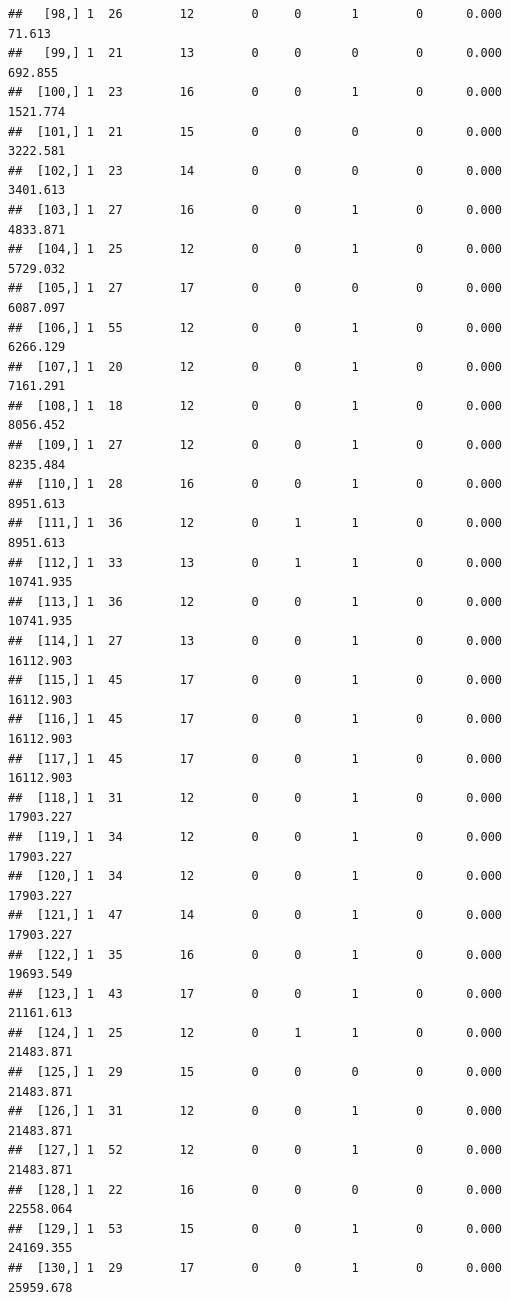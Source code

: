 \documentclass[
]{article}
\begin{document}
\begin{verbatim}
##   [98,] 1  26        12        0     0       1        0      0.000     71.613
##   [99,] 1  21        13        0     0       0        0      0.000    692.855
##  [100,] 1  23        16        0     0       1        0      0.000   1521.774
##  [101,] 1  21        15        0     0       0        0      0.000   3222.581
##  [102,] 1  23        14        0     0       0        0      0.000   3401.613
##  [103,] 1  27        16        0     0       1        0      0.000   4833.871
##  [104,] 1  25        12        0     0       1        0      0.000   5729.032
##  [105,] 1  27        17        0     0       0        0      0.000   6087.097
##  [106,] 1  55        12        0     0       1        0      0.000   6266.129
##  [107,] 1  20        12        0     0       1        0      0.000   7161.291
##  [108,] 1  18        12        0     0       1        0      0.000   8056.452
##  [109,] 1  27        12        0     0       1        0      0.000   8235.484
##  [110,] 1  28        16        0     0       1        0      0.000   8951.613
##  [111,] 1  36        12        0     1       1        0      0.000   8951.613
##  [112,] 1  33        13        0     1       1        0      0.000  10741.935
##  [113,] 1  36        12        0     0       1        0      0.000  10741.935
##  [114,] 1  27        13        0     0       1        0      0.000  16112.903
##  [115,] 1  45        17        0     0       1        0      0.000  16112.903
##  [116,] 1  45        17        0     0       1        0      0.000  16112.903
##  [117,] 1  45        17        0     0       1        0      0.000  16112.903
##  [118,] 1  31        12        0     0       1        0      0.000  17903.227
##  [119,] 1  34        12        0     0       1        0      0.000  17903.227
##  [120,] 1  34        12        0     0       1        0      0.000  17903.227
##  [121,] 1  47        14        0     0       1        0      0.000  17903.227
##  [122,] 1  35        16        0     0       1        0      0.000  19693.549
##  [123,] 1  43        17        0     0       1        0      0.000  21161.613
##  [124,] 1  25        12        0     1       1        0      0.000  21483.871
##  [125,] 1  29        15        0     0       0        0      0.000  21483.871
##  [126,] 1  31        12        0     0       1        0      0.000  21483.871
##  [127,] 1  52        12        0     0       1        0      0.000  21483.871
##  [128,] 1  22        16        0     0       0        0      0.000  22558.064
##  [129,] 1  53        15        0     0       1        0      0.000  24169.355
##  [130,] 1  29        17        0     0       1        0      0.000  25959.678

\end{verbatim}
\end{document}
